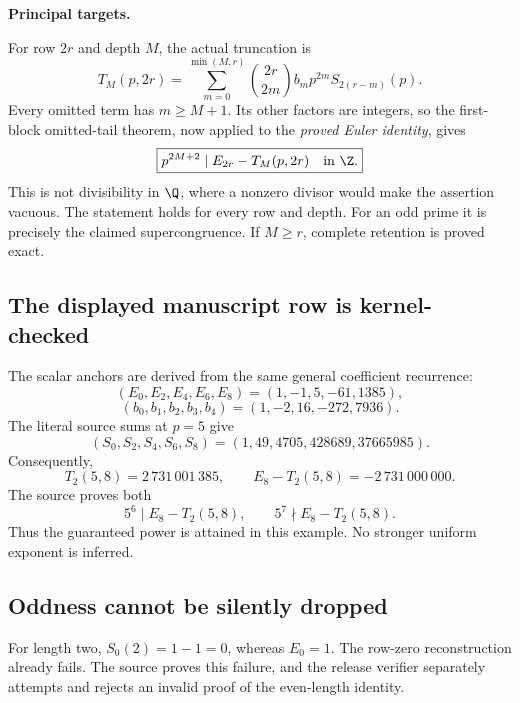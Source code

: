 \textbf{Principal targets.}\par
{}\par
{}\par
{}\par
{}
\par\medskip
{}
For row $2r$ and depth $M$, the actual truncation is
\[
 T_M(p,2r)=\sum_{m=0}^{\min(M,r)}\binom{2r}{2m}b_m p^{2m}S_{2(r-m)}(p).
\]
Every omitted term has $m\ge M+1$. Its other factors are integers, so the first-block omitted-tail theorem, now applied to the \emph{proved Euler identity}, gives
\[
 \boxed{p^{2M+2}\mid E_{2r}-T_M(p,2r)\quad\text{in }\Z.}
\]
This is not divisibility in $\Q$, where a nonzero divisor would make the assertion vacuous. The statement holds for every row and depth. For an odd prime it is precisely the claimed supercongruence. If $M\ge r$, complete retention is proved exact.

\subsection*{The displayed manuscript row is kernel-checked}
The scalar anchors are derived from the same general coefficient recurrence:
\[
 (E_0,E_2,E_4,E_6,E_8)=(1,-1,5,-61,1385),
\]
\[
 (b_0,b_1,b_2,b_3,b_4)=(1,-2,16,-272,7936).
\]
The literal source sums at $p=5$ give
\[
 (S_0,S_2,S_4,S_6,S_8)=(1,49,4705,428689,37665985).
\]
Consequently,
\[
 T_2(5,8)=2\,731\,001\,385,\qquad
 E_8-T_2(5,8)=-2\,731\,000\,000.
\]
The source proves both
\[
 5^6\mid E_8-T_2(5,8),\qquad 5^7\nmid E_8-T_2(5,8).
\]
Thus the guaranteed power is attained in this example. No stronger uniform exponent is inferred.

\subsection*{Oddness cannot be silently dropped}
For length two, $S_0(2)=1-1=0$, whereas $E_0=1$. The row-zero reconstruction already fails. The source proves this failure, and the release verifier separately attempts and rejects an invalid proof of the even-length identity.

